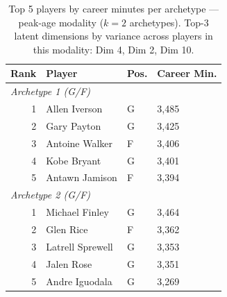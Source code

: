 \begin{table}[htbp]
  \centering\small
  \begin{tabular}{rlll}
    \toprule
    Rank & Player & Pos. & Career Min. \\
    \midrule
    \multicolumn{4}{l}{\textit{Archetype 1 (G/F)}} \\
    \midrule
    1 & Allen Iverson & G & 3,485 \\
    2 & Gary Payton & G & 3,425 \\
    3 & Antoine Walker & F & 3,406 \\
    4 & Kobe Bryant & G & 3,401 \\
    5 & Antawn Jamison & F & 3,394 \\
    \midrule[0.4pt]
    \multicolumn{4}{l}{\textit{Archetype 2 (G/F)}} \\
    \midrule
    1 & Michael Finley & G & 3,464 \\
    2 & Glen Rice & F & 3,362 \\
    3 & Latrell Sprewell & G & 3,353 \\
    4 & Jalen Rose & G & 3,351 \\
    5 & Andre Iguodala & G & 3,269 \\
    \bottomrule
  \end{tabular}
  \caption{Top 5 players by career minutes per archetype --- peak-age modality ($k=2$ archetypes). Top-3 latent dimensions by variance across players in this modality: Dim 4, Dim 2, Dim 10.}
  \label{tab:arch_reps_peak_age}
\end{table}


